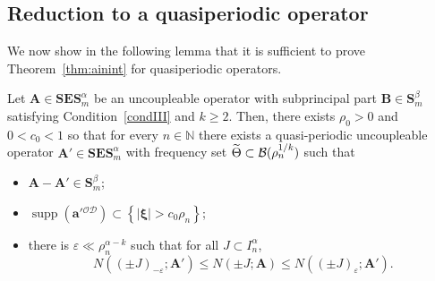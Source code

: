 \documentclass[AHL,Unicode,longabstracts,published]{cedram}
\DeclareMathOperator{\supp}{supp}
\newcommand{\N}{\mathbb N}
\newcommand{\CB}{\mathcal{B}}
\newcommand{\CD}{\mathcal{D}}
\newcommand{\CO}{\mathcal{O}}
\newcommand{\bxi}{\boldsymbol \xi}
\newcommand{\ba}{\mathbf a}
\newcommand{\BA}{\mathbf A}
\newcommand{\BB}{\mathbf B}
\newcommand{\BE}{\mathbf E}
\newcommand{\BS}{\mathbf S}
\newcommand{\pd}{uncoupleable}
\newcommand{\eps}{\varepsilon}
\newcommand{\abs}[1]{\left\lvert #1 \right\rvert}
\newcommand{\set}[1]{\left\{ #1 \right\}}
\let\oldtilde\tilde
\renewcommand*{\tilde}[1]{\mathchoice{\widetilde{#1}}{\widetilde{#1}}{\oldtilde{#1}}{\oldtilde{#1}}}
\begin{document}
\subsection{Reduction to a quasiperiodic operator}

We now show in the following lemma that it is sufficient to prove Theorem~\ref{thm:ainint} for quasiperiodic operators.
\begin{lemm}\label{lem:qpenough}
Let $\BA \in \BS\BE\BS_m^\alpha$ be an \pd{} operator with subprincipal part $\BB
\in \BS^\beta_m$ satisfying Condition~\ref{condIII} and $k \ge 2$. Then, there exists $\rho_0 > 0$ and $0 < c_0 < 1$ so that for every $n \in \N$ there exists a quasi-periodic \pd{} operator $\BA' \in \BS\BE \BS_m^\alpha$ with frequency set $\tilde \Theta \subset
\CB(\rho_n^{1/k})$ such that
\begin{itemize}
\setlength
\itemsep{1em}
\item $\BA - \BA' \in \BS_m^\beta$;
\item $\supp(\ba'{}^{\CO\CD}) \subset \set{\abs{\bxi} > c_0 \rho_n}$;
\item there is $\eps \ll \rho_n^{\alpha-k}$ such that for all $J \subset I_n^\alpha$,
\begin{equation}\label{eq:qpapprox}
N((\pm J)_{-\eps};\BA') \le N(\pm J;\BA) \le N((\pm J)_\eps;\BA').
\end{equation}
\end{itemize}
\end{lemm}
\end{document}
